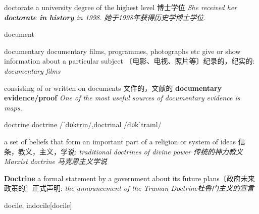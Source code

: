\begin{DefWord}{doctorate}
    a university degree of the highest level 博士学位
    \textit{She received her \textbf{doctorate in history} in 1998. 她于1998年获得历史学博士学位. }
\end{DefWord}


\begin{DefWord}{document}
\end{DefWord}

\begin{DefWord}{documentary}
    documentary films, programmes, photographs etc give or show information about a particular subject
    〔电影、电视、照片等〕纪录的，纪实的:
    \textit{documentary films}

    consisting of or written on documents
    文件的，文献的
    \textbf{documentary evidence/proof}
    \textit{One of the most useful sources of documentary evidence is maps.}
\end{DefWord}

\begin{DefWord}{doctrine}
    doctrine /ˈdɒktrɪn/,doctrinal /dɒkˈtraɪnl/

    a set of beliefs that form an important part of a religion or system of ideas
    信条，教义，主义，学说:
    \textit{traditional doctrines of divine power 传统的神力教义}
    \textit{Marxist doctrine 马克思主义学说}

    \textbf{Doctrine}  a formal statement by a government about its future plans〔政府未来政策的〕正式声明:
    \textit{the announcement of the Truman Doctrine杜鲁门主义的宣言}
\end{DefWord}

\begin{DefWord}{docile, indocile}[docile]
\end{DefWord}